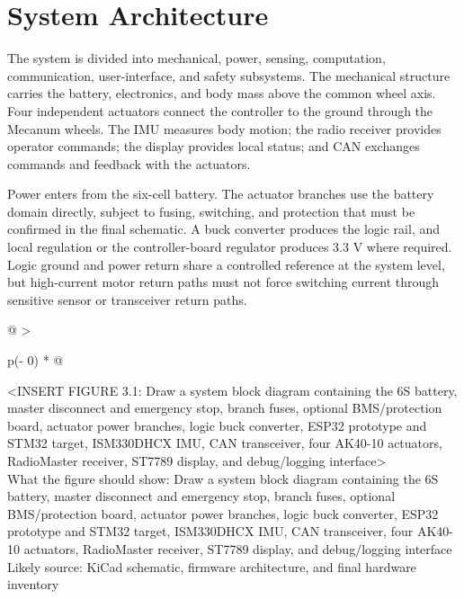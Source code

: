 \section{System Architecture}\label{system-architecture}

The system is divided into mechanical, power, sensing, computation,
communication, user-interface, and safety subsystems. The mechanical
structure carries the battery, electronics, and body mass above the
common wheel axis. Four independent actuators connect the controller to
the ground through the Mecanum wheels. The IMU measures body motion; the
radio receiver provides operator commands; the display provides local
status; and CAN exchanges commands and feedback with the actuators.

Power enters from the six-cell battery. The actuator branches use the
battery domain directly, subject to fusing, switching, and protection
that must be confirmed in the final schematic. A buck converter produces
the logic rail, and local regulation or the controller-board regulator
produces 3.3 V where required. Logic ground and power return share a
controlled reference at the system level, but high-current motor return
paths must not force switching current through sensitive sensor or
transceiver return paths.

\begin{longtable}[]{@{}
  >{\raggedright\arraybackslash}p{(\columnwidth - 0\tabcolsep) * }@{}}
\toprule\noalign{}
\begin{minipage}[b]{\linewidth}\raggedright
\textless INSERT FIGURE 3.1: Draw a system block diagram containing the
6S battery, master disconnect and emergency stop, branch fuses, optional
BMS\slash{}protection board, actuator power branches, logic buck converter,
ESP32 prototype and STM32 target, ISM330DHCX IMU, CAN transceiver, four
AK40-10 actuators, RadioMaster receiver, ST7789 display, and
debug\slash{}logging interface\textgreater{}\\
What the figure should show: Draw a system block diagram containing the
6S battery, master disconnect and emergency stop, branch fuses, optional
BMS\slash{}protection board, actuator power branches, logic buck converter,
ESP32 prototype and STM32 target, ISM330DHCX IMU, CAN transceiver, four
AK40-10 actuators, RadioMaster receiver, ST7789 display, and
debug\slash{}logging interface\\
Likely source: KiCad schematic, firmware architecture, and final
hardware inventory\strut
\end{minipage} \\
\midrule\noalign{}
\endhead
\bottomrule\noalign{}
\endlastfoot
\end{longtable}

